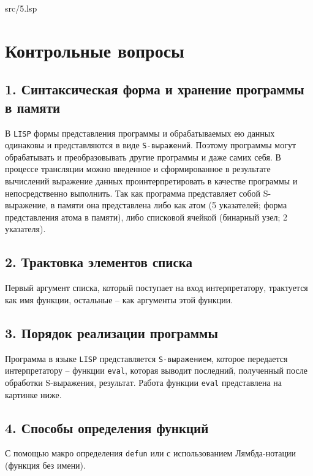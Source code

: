 \FloatBarrier
\begin{lstinputlisting}[style={lsp}]{src/5.lsp}
\end{lstinputlisting}
\FloatBarrier

\section*{Контрольные вопросы}

\subsection*{1. Синтаксическая форма и хранение программы в памяти}

В \texttt{LISP} формы представления программы и обрабатываемых ею данных одинаковы и представляются в виде \texttt{S-выражений}. 
Поэтому программы могут обрабатывать и преобразовывать другие программы и даже самих себя. 
В процессе трансляции можно введенное и сформированное в результате вычислений выражение данных проинтерпретировать в качестве программы и непосредственно выполнить. 
Так как программа представляет собой S-выражение, в памяти она представлена либо как атом (5 указателей; форма представления атома в памяти), либо списковой ячейкой (бинарный узел; 2 указателя).

\subsection*{2. Трактовка элементов списка}

Первый аргумент списка, который поступает на вход интерпретатору, трактуется как имя функции, остальные -- как аргументы этой функции.

\subsection*{3. Порядок реализации программы}

Программа в языке \texttt{LISP} представляется \texttt{S-выражением}, которое передается интерпретатору -- функции \texttt{eval}, которая выводит последний, полученный после обработки S-выражения, результат.
Работа функции \texttt{eval} представлена на картинке ниже.

\subsection*{4. Способы определения функций}

С помощью макро определения \texttt{defun} или с использованием Лямбда-нотации (функция без имени).